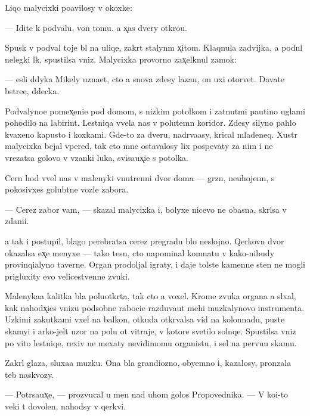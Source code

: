 \documentclass[10pt]{book}
\begin{document}
Liqo malycixki po{\y}avilosy v okoxke:

— Idite k podvalu, von tomu. {\Y}a x̨as dvery otkro{\y}u.

Spusk v podval toje b{\yi}l na uliqe, zakr{\yi}t{\yi}{\y} stalyn{\yi}m x̨itom. Klaqnula zadvijka, {\y}a podn{\ia}l nelegki{\y} l{\iu}k, spustilsa vniz. Malycixka provorno zax̨elknul zamok:

— {\Y}esli d{\ia}dyka Mikely uzna{\y}et, cto {\y}a snova zdesy laza{\y}u, on uxi otorvet. Dava{\y}te b{\yi}stre{\y}e, d{\ia}decka.

Podvalyno{\y}e pomex̨eni{\y}e pod domom, s nizkim potolkom i zat{\ia}nut{\yi}mi pautino{\y} uglami pohodilo na labirint. Lestniqa v{\yi}vela nas v polutemn{\yi}{\y} koridor. Zdesy silyno pahlo kvaxeno{\y} kapusto{\y} i koxkami. Gde-to za dver{\y}u, nadr{\yi}va{\y}asy, krical mladeneq. Xustr{\yi}{\y} malycixka bejal vpered, tak cto mne ostavalosy lix pospevaty za nim i ne vrezatsa golovo{\y} v v{\ia}zanki luka, svisa{\y}ux̨i{\y}e s potolka.

Cern{\yi}{\y} hod v{\yi}vel nas v malenyki{\y} vnutrenni{\y} dvor doma — gr{\ia}zn{\yi}{\y}, neuhojenn{\yi}{\y}, s pokosivxe{\y}s{\ia} golub{\ia}tne{\y} vozle zabora.

— Cerez zabor vam, — skazal malycixka i, bolyxe nicevo ne ob{\y}asn{\ia}{\y}a, skr{\yi}lsa v zdani{\y}i.

{\Y}a tak i postupil, blago perebratsa cerez pregradu b{\yi}lo neslojno. Qerkovn{\yi}{\y} dvor okazalsa {\y}ex̨e menyxe — tako{\y} tesn{\yi}{\y}, cto napominal komnatu v kako{\y}-nibudy provinqialyno{\y} taverne. Organ prodoljal igraty, i daje tolst{\yi}{\y}e kamenn{\yi}{\y}e sten{\yi} ne mogli prigluxity {\y}evo velicestvenn{\yi}{\y}e zvuki.

Malenyka{\y}a kalitka b{\yi}la poluotkr{\yi}ta, tak cto {\y}a voxel. Krome zvuka organa {\y}a sl{\yi}xal, kak nahod{\ia}x̨i{\y}es{\ia} vnizu podsobn{\yi}{\y}e raboci{\y}e razduva{\y}ut mehi muz{\yi}kalynovo instrumenta. Uzkimi zakutkami v{\yi}xel na balkon, otkuda otkr{\yi}valsa vid na kolonnadu, pust{\yi}{\y}e skamyi i {\y}arko-jelt{\yi}{\y} uzor na polu ot vitraje{\y}, v kotor{\yi}{\y}e svetilo solnqe. Spustilsa vniz po vito{\y} lestniqe, rexiv ne mexaty nevidimomu organistu, i sel na pervu{\y}u skam{\y}u.

Zakr{\yi}l glaza, sluxa{\y}a muz{\yi}ku. Ona b{\yi}la grandiozno{\y}, obyemno{\y} i, kazalosy, pronzala teb{\ia} naskvozy.

— Potr{\ia}sa{\y}ux̨e, — prozvucal u men{\ia} nad uhom golos Propovednika. — V ko{\y}i-to veki t{\yi} dovolen, nahod{\ia}sy v qerkvi.
\end{document}
